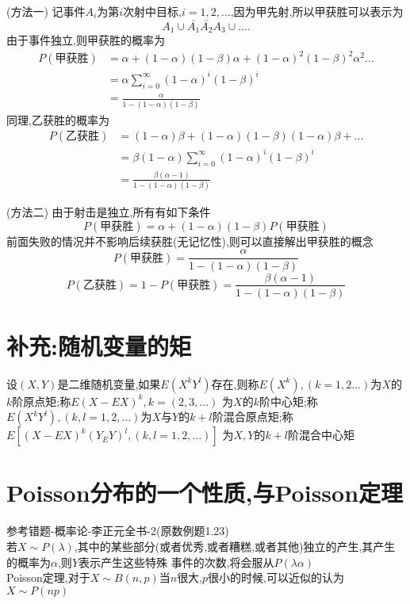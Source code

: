 \documentclass[12pt, a4paper, oneside, UTF8]{ctexbook}
\begin{document}
    \begin{solution}
        \item [(方法一)]
        记事件$A_i$为第$i$次射中目标,$i=1,2,\ldots$,因为甲先射,所以甲获胜可以表示为 
        \[
        A_1\cup\bar{A_1}\bar{A_2}A_3\cup\ldots.
        \]
        由于事件独立,则甲获胜的概率为
        \begin{align*}
        P(\text{甲获胜}) 
        &= \alpha + (1-\alpha)(1-\beta)\alpha + (1-\alpha)^2(1-\beta)^2\alpha^2\ldots \\ 
        &= \alpha \sum_{i=0}^{\infty}(1-\alpha)^{i}(1-\beta)^i \\
        &= \frac{\alpha}{1- (1-\alpha)(1-\beta)}
        \end{align*}
        同理,乙获胜的概率为
        \begin{align*}
        P(\text{乙获胜}) 
        &= (1-\alpha)\beta + (1-\alpha)(1-\beta)(1-\alpha)\beta+\ldots \\ 
        &= \beta(1-\alpha)\sum_{i=0}^{\infty}(1-\alpha)^i(1-\beta)^i \\
        &= \frac{\beta(\alpha-1)}{1- (1-\alpha)(1-\beta)}
        \end{align*}
        \item [(方法二)]
        由于射击是独立,所有有如下条件
        \[
        P(\text{甲获胜})=\alpha + (1-\alpha)(1-\beta)P(\text{甲获胜}) 
        \]
        前面失败的情况并不影响后续获胜(无记忆性),则可以直接解出甲获胜的概念
        \[
        P(\text{甲获胜})= \frac{\alpha}{1- (1-\alpha)(1-\beta)}
        \]
        \[
        P(\text{乙获胜}) = 1 - P(\text{甲获胜}) = \frac{\beta(\alpha-1)}{1- (1-\alpha)(1-\beta)}
        \]
    \end{solution}
\section{补充:随机变量的矩}
    设$(X,Y)$是二维随机变量,如果$E(X^kY^l)$存在,则称$E(X^k),(k=1,2\ldots)$为$X$的$k$阶原点矩;称$E(X-EX)^k,k=(2,3,\ldots)$
    为$X$的$k$阶中心矩;称$E(X^kY^l),(k,l=1,2,\ldots)$为$X$与$Y$的$k+l$阶混合原点矩;称$E[(X-EX)^k(Y_EY)^l,(k,l=1,2,\ldots)]$
    为$X,Y$的$k+l$阶混合中心矩 
\ifx\allfiles\undefined
\section{Poisson分布的一个性质,与Poisson定理}
参考错题-概率论-李正元全书-2(原数例题1.23) \\
若$X\sim P(\lambda)$,其中的某些部分(或者优秀,或者糟糕,或者其他)独立的产生,其产生的概率为$\alpha$,则$Y$表示产生这些特殊
事件的次数,将会服从$P(\lambda\alpha)$ \\
Poisson定理,对于$X\sim B(n, p)$当$n$很大,$p$很小的时候,可以近似的认为$X\sim P(np)$
\end{document}
